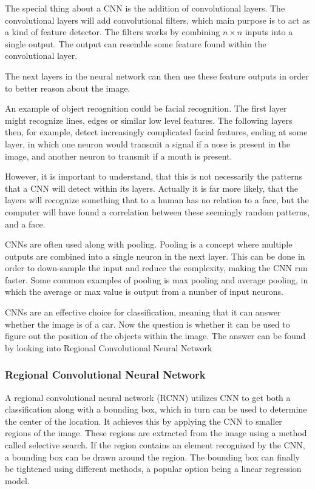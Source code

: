 The special thing about a CNN is the addition of convolutional layers.
The convolutional layers will add convolutional filters, which main purpose is to act as a kind of feature detector.
The filters works by combining $n \times n$ inputs into a single output.
The output can resemble some feature found within the convolutional layer.



The next layers in the neural network can then use these feature outputs in order to better reason about the image.

An example of object recognition could be facial recognition.
The first layer might recognize lines, edges or similar low level features.
The following layers then, for example, detect increasingly complicated facial features, ending at some layer, in which one neuron would transmit a signal if a nose is present in the image, and another neuron to transmit if a mouth is present.


However, it is important to understand, that this is not necessarily the patterns that a CNN will detect within its layers.
Actually it is far more likely, that the layers will recognize something that to a human has no relation to a face, but the computer will have found a correlation between these seemingly random patterns, and a face.

CNNs are often used along with pooling.
Pooling is a concept where multiple outputs are combined into a single neuron in the next layer.
This can be done in order to down-sample the input and reduce the complexity, making the CNN run faster.
Some common examples of pooling is max pooling and average pooling, in which the average or max value is output from a number of input neurons.

CNNs are an effective choice for classification, meaning that it can answer whether the image is of a car.
Now the question is whether it can be used to figure out the position of the objects within the image.
The answer can be found by looking into Regional Convolutional Neural Network


\subsubsection{Regional Convolutional Neural Network}
A regional convolutional neural network (RCNN) utilizes CNN to get both a classification along with a bounding box, which in turn can be used to determine the center of the location.
It achieves this by applying the CNN to smaller regions of the image. 
These regions are extracted from the image using a method called selective search.
If the region contains an element recognized by the CNN, a bounding box can be drawn around the region.
The bounding box can finally be tightened using different methods, a popular option being a linear regression model.\cite{CNNHistory}

